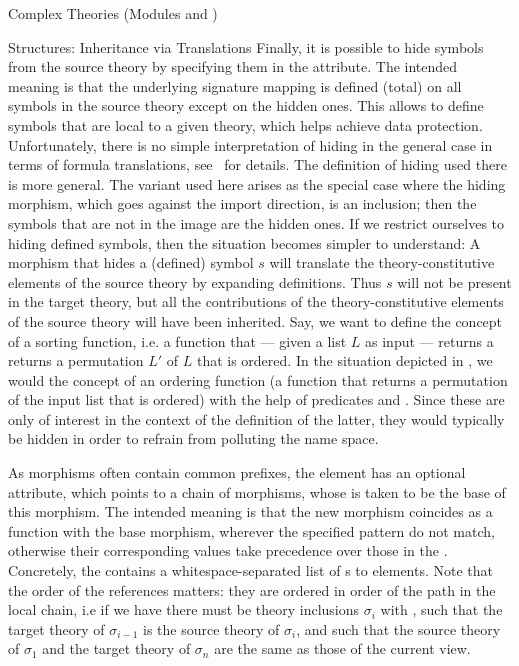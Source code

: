 \begin{tchapter}[id=complex-theories,short=Complex Theories]{Complex Theories (Modules
     and )}
\begin{tsection}[id=morphisms]{Structures: Inheritance via Translations}
Finally, it is possible to hide symbols from the source theory by specifying them in the
 attribute. The intended meaning is that the underlying
signature mapping is defined (total) on all symbols in the source theory except on the
hidden ones. This allows to define symbols that are local to a given theory, which helps
achieve data protection. Unfortunately, there is no simple interpretation of hiding in the
general case in terms of formula translations, see~\cite{CoFI:2004:CASL-RM,MAH-06-a} for
details. The definition of hiding used there is more general. The variant used here arises
as the special case where the hiding morphism, which goes against the import direction, is
an inclusion; then the symbols that are not in the image are the hidden ones.  If we
restrict ourselves to hiding defined symbols, then the situation becomes simpler to
understand: A morphism that hides a (defined) symbol $s$ will translate the
theory-constitutive elements of the source theory by expanding definitions. Thus $s$ will
not be present in the target theory, but all the contributions of the theory-constitutive
elements of the source theory will have been inherited. Say, we want to define the concept
of a sorting function, i.e. a function that --- given a list $L$ as input --- returns a
returns a permutation $L'$ of $L$ that is ordered. In the situation depicted in
, we would the concept of an ordering function (a function
that returns a permutation of the input list that is ordered) with the help of predicates
 and . Since these are only of interest in the context
of the definition of the latter, they would typically be hidden in order to refrain from
polluting the name space.

As morphisms often contain common prefixes, the  element has an optional
 attribute, which points to a chain of
morphisms, whose  is taken to be the base of
this morphism. The intended meaning is that the new morphism coincides as a function with
the base morphism, wherever the specified pattern do not match, otherwise their
corresponding values take precedence over those in the .
Concretely, the  contains a whitespace-separated list of
s to  elements. Note that the order of the
references matters: they are ordered in order of the path in the local chain, i.e if we
have  there must be theory
inclusions $\sigma_i$ with , such that the
target theory of $\sigma_{i-1}$ is the source theory of $\sigma_i$, and such that the
source theory of $\sigma_1$ and the target theory of $\sigma_n$ are the same as those of
the current view.


\end{tsection}
\end{tchapter}
